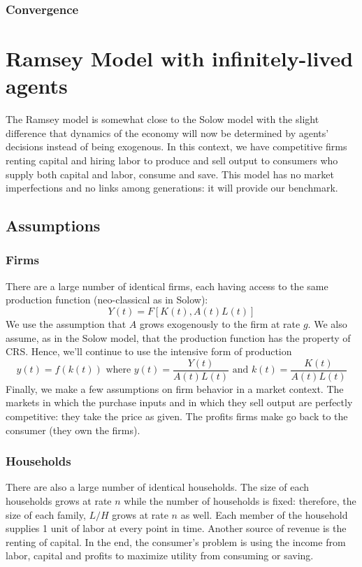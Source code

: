 \documentclass[12pt]{report}
\begin{document}
\subsection{Convergence}

\chapter{Ramsey Model with infinitely-lived agents}

The Ramsey model is somewhat close to the Solow model with the slight difference that dynamics of the economy will now be determined by agents' decisions instead of being exogenous. In this context, we have competitive firms renting capital and hiring labor to produce and sell output to consumers who supply both capital and labor, consume and save. This model has no market imperfections and no links among generations: it will provide our benchmark.

\section{Assumptions}

\subsection{Firms}

There are a large number of identical firms, each having access to the same production function (neo-classical as in Solow): $$ Y(t) = F[K(t),A(t) L(t)]$$ 
We use the assumption that $A$ grows exogenously to the firm at rate $g$. We also assume, as in the Solow model, that the production function has the property of CRS. Hence, we'll continue to use the intensive form of production $$y(t) = f(k(t)) \text{ where } y(t) = \frac{Y(t)}{A(t)L(t)}\text{ and } k(t) = \frac{K(t)}{A(t)L(t)} $$ Finally, we make a few assumptions on firm behavior in a market context. The markets in which the purchase inputs and in which they sell output are perfectly competitive: they take the price as given. The profits firms make go back to the consumer (they own the firms).

\subsection{Households}

There are also a large number of identical households. The size of each households grows at rate $n$ while the number of households is fixed: therefore, the size of each family, $L/H$ grows at rate $n$ as well. Each member of the household supplies 1 unit of labor at every point in time. Another source of revenue is the renting of capital. In the end, the consumer's problem is using the income from labor, capital and profits to maximize utility from consuming or saving.
\end{document}
